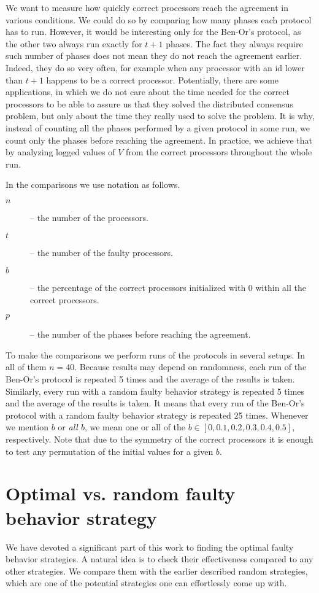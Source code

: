 We want to measure how quickly correct processors reach the agreement in various conditions. We could do so by comparing how many phases each protocol has to run. However, it would be interesting only for the Ben-Or's protocol, as the other two always run exactly for $t+1$ phases. The fact they always require such number of phases does not mean they do not reach the agreement earlier. Indeed, they do so very often, for example when any processor with an id lower than $t+1$ happens to be a correct processor.
Potentially, there are some applications, in which we do not care about the time needed for the correct processors to be able to assure us that they solved the distributed consensus problem, but only about the time they really used to solve the problem. It is why, instead of counting all the phases performed by a given protocol in some run, we count only the phases before reaching the agreement. In practice, we achieve that by analyzing logged values of $V$ from the correct processors throughout the whole run.

In the comparisons we use notation as follows.
\begin{description}
\item[$n$] -- the number of the processors.
\item[$t$] -- the number of the faulty processors.
\item[$b$] -- the percentage of the correct processors initialized with $0$ within all the correct processors.
\item[$p$] -- the number of the phases before reaching the agreement.
\end{description}

To make the comparisons we perform runs of the protocols in several setups. In all of them $n=40$. Because results may depend on randomness, each run of the Ben-Or's protocol is repeated 5 times and the average of the results is taken. Similarly, every run with a random faulty behavior strategy is repeated 5 times and the average of the results is taken. It means that every run of the Ben-Or's protocol with a random faulty behavior strategy is repeated 25 times. Whenever we mention $b$ or \textit{all $b$}, we mean one or all of the $b\in[0,0.1,0.2,0.3,0.4,0.5]$, respectively. Note that due to the symmetry of the correct processors it is enough to test any permutation of the initial values for a given $b$.

\section{Optimal vs. random faulty behavior strategy}
We have devoted a significant part of this work to finding the optimal faulty behavior strategies. A natural idea is to check their effectiveness compared to any other strategies. We compare them with the earlier described random strategies, which are one of the potential strategies one can effortlessly come up with. 

